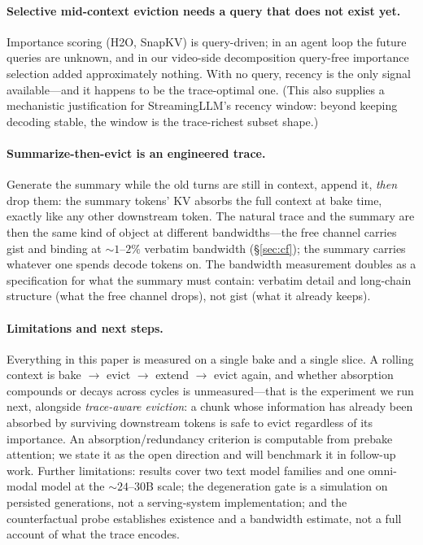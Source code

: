 \documentclass{article} %
\begin{document}
\paragraph{Selective mid-context eviction needs a query that does not exist yet.}
Importance scoring (H2O, SnapKV) is query-driven; in an agent loop the future queries are unknown, and in our video-side decomposition query-free importance selection added approximately nothing. With no query, recency is the only signal available---and it happens to be the trace-optimal one. (This also supplies a mechanistic justification for StreamingLLM's recency window: beyond keeping decoding stable, the window is the trace-richest subset shape.)

\paragraph{Summarize-then-evict is an engineered trace.}
Generate the summary while the old turns are still in context, append it, \emph{then} drop them: the summary tokens' KV absorbs the full context at bake time, exactly like any other downstream token. The natural trace and the summary are then the same kind of object at different bandwidths---the free channel carries gist and binding at ${\sim}1$--$2\%$ verbatim bandwidth (\S\ref{sec:cf}); the summary carries whatever one spends decode tokens on. The bandwidth measurement doubles as a specification for what the summary must contain: verbatim detail and long-chain structure (what the free channel drops), not gist (what it already keeps).

\paragraph{Limitations and next steps.}
Everything in this paper is measured on a single bake and a single slice. A rolling context is bake $\rightarrow$ evict $\rightarrow$ extend $\rightarrow$ evict again, and whether absorption compounds or decays across cycles is unmeasured---that is the experiment we run next, alongside \emph{trace-aware eviction}: a chunk whose information has already been absorbed by surviving downstream tokens is safe to evict regardless of its importance. An absorption/redundancy criterion is computable from prebake attention; we state it as the open direction and will benchmark it in follow-up work. Further limitations: results cover two text model families and one omni-modal model at the ${\sim}24$--$30$B scale; the degeneration gate is a simulation on persisted generations, not a serving-system implementation; and the counterfactual probe establishes existence and a bandwidth estimate, not a full account of what the trace encodes.
\end{document}
